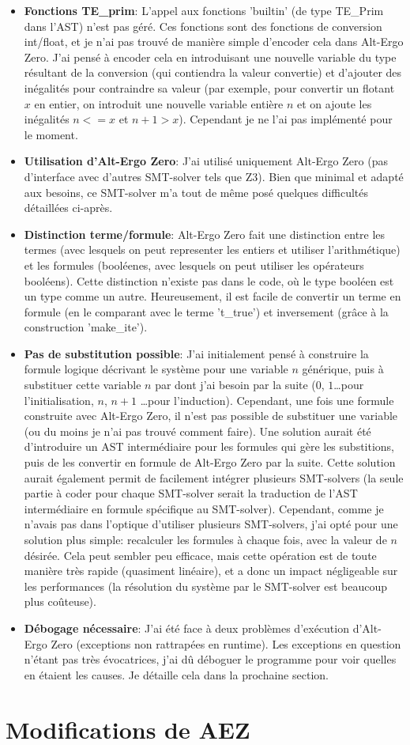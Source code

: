 \documentclass[a4paper]{article}%
\begin{document}
	\begin{itemize}
		\item \textbf{Fonctions TE\_prim}: L'appel aux fonctions 'builtin' (de type TE\_Prim dans l'AST) n'est pas géré.
		Ces fonctions sont des fonctions de conversion int/float, et je n'ai pas trouvé de manière simple d'encoder cela dans Alt-Ergo Zero.
		J'ai pensé à encoder cela en introduisant une nouvelle variable du type résultant de la conversion (qui contiendra la valeur convertie)
		et d'ajouter des inégalités pour contraindre sa valeur (par exemple, pour convertir un flotant $x$ en entier, on introduit une nouvelle
		variable entière $n$ et on ajoute les inégalités $n <= x$ et $n+1 > x$). Cependant je ne l'ai pas implémenté pour le moment.
		\item \textbf{Utilisation d'Alt-Ergo Zero}: J'ai utilisé uniquement Alt-Ergo Zero (pas d'interface avec d'autres SMT-solver tels que Z3).
		Bien que minimal et adapté aux besoins, ce SMT-solver m'a tout de même posé quelques difficultés détaillées ci-après.
		\item \textbf{Distinction terme/formule}: Alt-Ergo Zero fait une distinction entre les termes (avec lesquels on peut representer les entiers
		et utiliser l'arithmétique) et les formules (booléenes, avec lesquels on peut utiliser les opérateurs booléens).
		Cette distinction n'existe pas dans le code, où le type booléen est un type comme un autre.
		Heureusement, il est facile de convertir un terme en formule (en le comparant avec le terme 't\_true') et inversement (grâce à la construction 'make\_ite').
		\item \textbf{Pas de substitution possible}: J'ai initialement pensé à construire la formule logique décrivant le système pour une variable $n$ générique,
		puis à substituer cette variable $n$ par dont j'ai besoin par la suite ($0$, $1$\dots pour l'initialisation, $n$, $n+1$ \ldots pour l'induction).
		Cependant, une fois une formule construite avec Alt-Ergo Zero, il n'est pas possible de substituer une variable (ou du moins je n'ai pas trouvé comment faire).
		Une solution aurait été d'introduire un AST intermédiaire pour les formules qui gère les substitions, puis de les convertir en formule de Alt-Ergo Zero par la suite.
		Cette solution aurait également permit de facilement intégrer plusieurs SMT-solvers (la seule partie à coder pour chaque SMT-solver serait la traduction de l'AST intermédiaire
		en formule spécifique au SMT-solver). Cependant, comme je n'avais pas dans l'optique d'utiliser plusieurs SMT-solvers, j'ai opté pour une solution plus simple:
		recalculer les formules à chaque fois, avec la valeur de $n$ désirée. Cela peut sembler peu efficace, mais cette opération est de toute manière très rapide
		(quasiment linéaire), et a donc un impact négligeable sur les performances (la résolution du système par le SMT-solver est beaucoup plus coûteuse).
		\item \textbf{Débogage nécessaire}: J'ai été face à deux problèmes d'exécution d'Alt-Ergo Zero (exceptions non rattrapées en runtime). Les exceptions en question n'étant pas
		très évocatrices, j'ai dû déboguer le programme pour voir quelles en étaient les causes. Je détaille cela dans la prochaine section.
	\end{itemize}

	\section{Modifications de AEZ}
		
\end{document}
